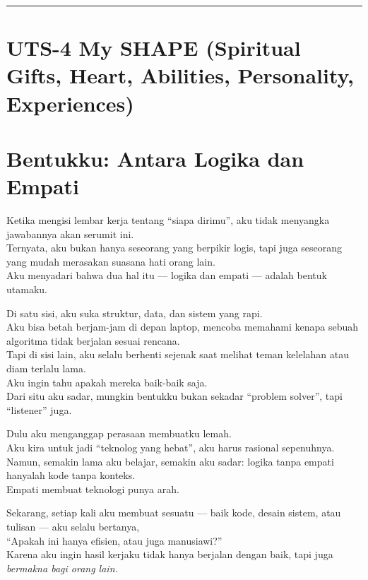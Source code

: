 \documentclass[
  letterpaper,
  DIV=11,
  numbers=noendperiod]{scrreprt}
\begin{document}
\begin{center}\rule{0.5\linewidth}{0.5pt}\end{center}


\chapter{UTS-4 My SHAPE (Spiritual Gifts, Heart, Abilities, Personality,
Experiences)}\label{uts-4-my-shape-spiritual-gifts-heart-abilities-personality-experiences}


\chapter{Bentukku: Antara Logika dan
Empati}\label{bentukku-antara-logika-dan-empati}

Ketika mengisi lembar kerja tentang ``siapa dirimu'', aku tidak
menyangka jawabannya akan serumit ini.\\
Ternyata, aku bukan hanya seseorang yang berpikir logis, tapi juga
seseorang yang mudah merasakan suasana hati orang lain.\\
Aku menyadari bahwa dua hal itu --- logika dan empati --- adalah bentuk
utamaku.

Di satu sisi, aku suka struktur, data, dan sistem yang rapi.\\
Aku bisa betah berjam-jam di depan laptop, mencoba memahami kenapa
sebuah algoritma tidak berjalan sesuai rencana.\\
Tapi di sisi lain, aku selalu berhenti sejenak saat melihat teman
kelelahan atau diam terlalu lama.\\
Aku ingin tahu apakah mereka baik-baik saja.\\
Dari situ aku sadar, mungkin bentukku bukan sekadar ``problem solver'',
tapi ``listener'' juga.

Dulu aku menganggap perasaan membuatku lemah.\\
Aku kira untuk jadi ``teknolog yang hebat'', aku harus rasional
sepenuhnya.\\
Namun, semakin lama aku belajar, semakin aku sadar: logika tanpa empati
hanyalah kode tanpa konteks.\\
Empati membuat teknologi punya arah.

Sekarang, setiap kali aku membuat sesuatu --- baik kode, desain sistem,
atau tulisan --- aku selalu bertanya,\\
``Apakah ini hanya efisien, atau juga manusiawi?''\\
Karena aku ingin hasil kerjaku tidak hanya berjalan dengan baik, tapi
juga \emph{bermakna bagi orang lain.}
\end{document}
